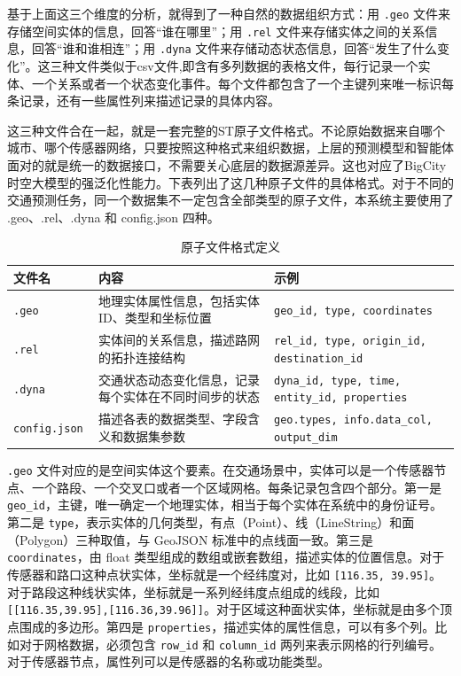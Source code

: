 基于上面这三个维度的分析，就得到了一种自然的数据组织方式：用 \texttt{.geo} 文件来存储空间实体的信息，回答“谁在哪里”；用 \texttt{.rel} 文件来存储实体之间的关系信息，回答“谁和谁相连”；用 \texttt{.dyna} 文件来存储动态状态信息，回答“发生了什么变化”。这三种文件类似于csv文件,即含有多列数据的表格文件，每行记录一个实体、一个关系或者一个状态变化事件。每个文件都包含了一个主键列来唯一标识每条记录，还有一些属性列来描述记录的具体内容。

这三种文件合在一起，就是一套完整的ST原子文件格式。不论原始数据来自哪个城市、哪个传感器网络，只要按照这种格式来组织数据，上层的预测模型和智能体面对的就是统一的数据接口，不需要关心底层的数据源差异。这也对应了BigCity时空大模型的强泛化性能力。下表列出了这几种原子文件的具体格式。对于不同的交通预测任务，同一个数据集不一定包含全部类型的原子文件，本系统主要使用了 .geo、.rel、.dyna 和 config.json 四种。


\begin{table}[H]
\centering
\caption{原子文件格式定义}
\label{tab:atomic-files}
\begin{tabular}{p{2.5cm}|p{4cm}|p{6cm}}
\hline
文件名 & 内容 & 示例 \\
\hline
\tt .geo & 地理实体属性信息，包括实体ID、类型和坐标位置 & \tt geo\_id, type, coordinates \\
\hline
\tt .rel & 实体间的关系信息，描述路网的拓扑连接结构 & \tt rel\_id, type, origin\_id, destination\_id \\
\hline
\tt .dyna & 交通状态动态变化信息，记录每个实体在不同时间步的状态 & \tt dyna\_id, type, time, entity\_id, properties \\
\hline
\tt config.json & 描述各表的数据类型、字段含义和数据集参数 & \tt geo.types, info.data\_col, output\_dim \\
\hline
\end{tabular}
\end{table}

\texttt{.geo} 文件对应的是空间实体这个要素。在交通场景中，实体可以是一个传感器节点、一个路段、一个交叉口或者一个区域网格。每条记录包含四个部分。第一是 \texttt{geo\_id}，主键，唯一确定一个地理实体，相当于每个实体在系统中的身份证号。第二是 \texttt{type}，表示实体的几何类型，有点（Point）、线（LineString）和面（Polygon）三种取值，与 GeoJSON 标准中的点线面一致。第三是 \texttt{coordinates}，由 float 类型组成的数组或嵌套数组，描述实体的位置信息。对于传感器和路口这种点状实体，坐标就是一个经纬度对，比如 \texttt{[116.35, 39.95]}。对于路段这种线状实体，坐标就是一系列经纬度点组成的线段，比如 \texttt{[[116.35,39.95],[116.36,39.96]]}。对于区域这种面状实体，坐标就是由多个顶点围成的多边形。第四是 \texttt{properties}，描述实体的属性信息，可以有多个列。比如对于网格数据，必须包含 \texttt{row\_id} 和 \texttt{column\_id} 两列来表示网格的行列编号。对于传感器节点，属性列可以是传感器的名称或功能类型。

